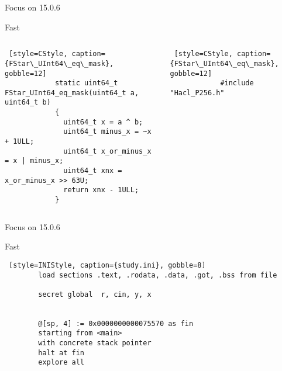 \documentclass[A4,svgnames,9pt,aspectratio=169]{beamer}
\begin{document}

\begin{frame}[fragile]{Focus on 15.0.6}
  \begin{block}{Fast}
    \begin{columns}
      \begin{column}{0.5\textwidth}
        \begin{lstlisting} [style=CStyle, caption={FStar\_UInt64\_eq\_mask}, gobble=12]
            static uint64_t FStar_UInt64_eq_mask(uint64_t a, uint64_t b)
            {
              uint64_t x = a ^ b;
              uint64_t minus_x = ~x + 1ULL;
              uint64_t x_or_minus_x = x | minus_x;
              uint64_t xnx = x_or_minus_x >> 63U;
              return xnx - 1ULL;
            }
          \end{lstlisting}
      \end{column}


      \begin{column}{0.5\textwidth}
        \begin{lstlisting} [style=CStyle, caption={FStar\_UInt64\_eq\_mask}, gobble=12]
            #include "Hacl_P256.h"
          \end{lstlisting}
      \end{column}
    \end{columns}
  \end{block}
\end{frame}


\begin{frame}[fragile]{Focus on 15.0.6}
  \begin{block}{Fast}
    \begin{lstlisting} [style=INIStyle, caption={study.ini}, gobble=8]
        load sections .text, .rodata, .data, .got, .bss from file

        secret global  r, cin, y, x


        @[sp, 4] := 0x0000000000075570 as fin
        starting from <main>
        with concrete stack pointer
        halt at fin
        explore all
      \end{lstlisting}
    \end{block}
\end{frame}

\end{document}
